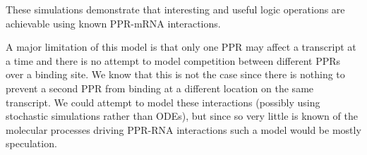 These simulations demonstrate that interesting and useful logic operations are
achievable using known PPR-mRNA interactions.

A major limitation of this model is that only one PPR may affect a transcript
at a time and there is no attempt to model competition between different PPRs 
over a binding site.
We know that this is not the case since there is nothing to prevent a second
PPR from binding at a different location on the same transcript.
We could attempt to model these interactions (possibly using stochastic
simulations rather than ODEs), but since so very little is known of the 
molecular processes driving PPR-RNA interactions such a model would be mostly
speculation.

\begin{figure}
  \begin{center}
    \begin{subfigure}{0.25\textwidth}
      \centering
    \end{subfigure}
    ~
    \begin{subfigure}{0.7\textwidth}
      \centering
    \end{subfigure}
  \end{center}
  \caption{
    \textbf{An implementation of a NOT gate.}
    Expression of $A$ causes the output to be repressed.
    \label{fig:not_simulation}}

  \begin{center}
    \begin{subfigure}{0.25\textwidth}
      \centering
\end{subfigure}
\end{center}
\end{figure}
